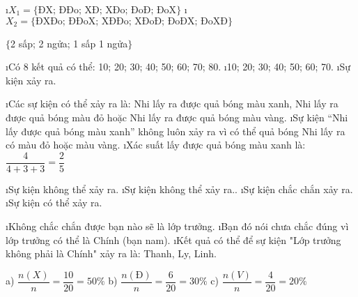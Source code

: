\begin{Answer}{19}
		\begin{enumerate}[a),leftmargin=*]
			\i $X_1 = \{\text{ĐX; ĐĐo; XĐ; XĐo; ĐoĐ; ĐoX}\}$
			\i $X_2 = \{\text{ĐXĐo; ĐĐoX; XĐĐo; XĐoĐ; ĐoĐX; ĐoXĐ}\}$
		\end{enumerate}
	
\end{Answer}
\begin{Answer}{20}
	$\{$2 sấp; 2 ngửa; 1 sấp 1 ngửa$\}$
	
\end{Answer}
\begin{Answer}{21}
		\begin{enumerate}[a),leftmargin=*]
			\i Có 8 kết quả có thể: 10; 20; 30; 40; 50; 60; 70; 80.
			\i 10; 20; 30; 40; 50; 60; 70.
			\i Sự kiện xảy ra.
		\end{enumerate}
	
\end{Answer}
\begin{Answer}{22}
		\begin{enumerate}[a),leftmargin=*]
			\i Các sự kiện có thể xảy ra là: Nhi lấy ra được quả bóng màu xanh, Nhi lấy ra được quả bóng màu đỏ hoặc Nhi lấy ra được quả bóng màu vàng.
			\i Sự kiện “Nhi lấy được quả bóng màu xanh” không luôn xảy ra vì có thể quả bóng Nhi lấy ra có màu đỏ hoặc màu vàng.
			\i Xác suất lấy được quả bóng màu xanh là: $\dfrac{4}{{4 + 3 + 3}} = \dfrac{2}{5}$
		\end{enumerate}
	
\end{Answer}
\begin{Answer}{23}
		\begin{enumerate}[a),leftmargin=*]
			\i Sự kiện không thể xảy ra.
			\i Sự kiện không thể xảy ra..
			\i Sự kiện chắc chắn xảy ra.
			\i Sự kiện có thể xảy ra.
		\end{enumerate}
	
\end{Answer}
\begin{Answer}{24}
		\begin{enumerate}[a),leftmargin=*]
			\i Không chắc chắn được bạn nào sẽ là lớp trưởng.
			\i Bạn đó nói chưa chắc đúng vì lớp trưởng có thể là Chính (bạn nam).
			\i Kết quả có thể để sự kiện "Lớp trưởng không phải là Chính" xảy ra là: Thanh, Ly, Linh.
		\end{enumerate}
	
\end{Answer}
\begin{Answer}{25}
			a) $\dfrac{n(X)}{n} = \dfrac{10}{20} = 50\%$\quad\quad
			b) $\dfrac{n(Đ)}{n} = \dfrac{6}{20} = 30\%$\quad\quad
			c) $\dfrac{n(V)}{n} = \dfrac{4}{20} = 20\%$
	
\end{Answer}
